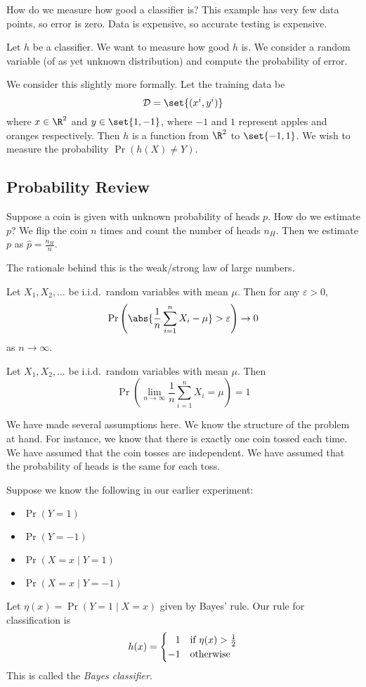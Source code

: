 How do we measure how good a classifier is?
This example has very few data points, so error is zero.
Data is expensive, so accurate testing is expensive.

Let $h$ be a classifier.
We want to measure how good $h$ is.
We consider a random variable (of as yet unknown distribution) and compute
the probability of error.

We consider this slightly more formally.
Let the training data be \[
    \mathcal{D} = \set{(x^i, y^i)}
\] where $x \in \R^2$ and $y \in \set{1, -1}$, where $-1$ and $1$ represent
apples and oranges respectively.
Then $h$ is a function from $\R^2$ to $\set{-1, 1}$.
We wish to measure the probability $\Pr(h(X) \ne Y)$.

\subsection{Probability Review} \label{sec:probability_review}
Suppose a coin is given with unknown probability of heads $p$.
How do we estimate $p$?
We flip the coin $n$ times and count the number of heads $n_H$.
Then we estimate $p$ as $\hat{p} = \frac{n_H}{n}$.

The rationale behind this is the weak/strong law of large numbers.
\begin{theorem} \label{thm:probability_review:wlln}
    Let $X_1, X_2, \ldots$ be i.i.d.~random variables with mean $\mu$.
    Then for any $\varepsilon > 0$, \[
        \Pr\left(\abs{\frac{1}{n} \sum_{i=1}^n X_i - \mu} > \varepsilon\right)
        \to 0
    \] as $n \to \infty$.
\end{theorem}

\begin{theorem} \label{thm:probability_review:slln}
    Let $X_1, X_2, \ldots$ be i.i.d.~random variables with mean $\mu$.
    Then \[
        \Pr\left(\lim_{n \to \infty} \frac{1}{n} \sum_{i=1}^n X_i = \mu\right)
        = 1
    \]
\end{theorem}
We have made several assumptions here.
We know the structure of the problem at hand.
For instance, we know that there is exactly one coin tossed each time.
We have assumed that the coin tosses are independent.
We have assumed that the probability of heads is the same for each toss.

Suppose we know the following in our earlier experiment:
\begin{itemize}
    \item $\Pr(Y = 1)$
    \item $\Pr(Y = -1)$
    \item $\Pr(X = x \mid Y = 1)$
    \item $\Pr(X = x \mid Y = -1)$
\end{itemize}
Let $\eta(x) = \Pr(Y = 1 \mid X = x)$ given by Bayes' rule.
Our rule for classification is \[
    h(x) = \begin{cases}
        \hphantom{-}1 & \text{if } \eta(x) > \frac{1}{2} \\
        -1 & \text{otherwise}
    \end{cases}
\] This is called the \emph{Bayes classifier}.

